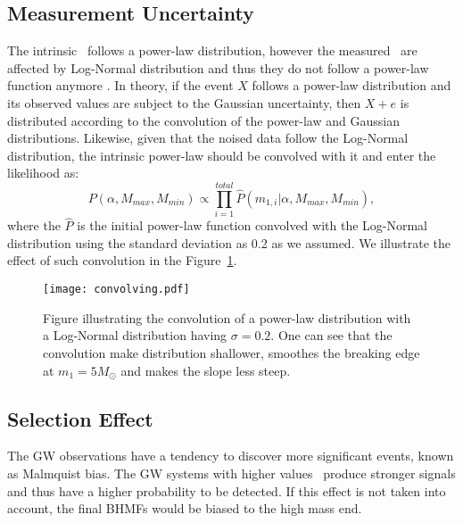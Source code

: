 \documentclass[twocolumn]{aastex62}
\begin{document}
\subsection{Measurement Uncertainty}\label{sec_likelihood_noise}
The intrinsic \mone\ follows a power-law distribution, however the measured  \mone\ are affected by Log-Normal distribution and thus they do not follow a power-law function anymore \citep{Koen2009}. In theory, if the event $X$ follows a power-law distribution and its observed values are subject to the Gaussian uncertainty, then $X + e$ is distributed according to the convolution of the power-law and Gaussian distributions. Likewise, given that the noised data follow the Log-Normal distribution, the intrinsic power-law should be convolved with it and enter the likelihood as:
 \begin{equation} \label{equ_lik_conv}
 P(\alpha, M_{max}, M_{min}) \propto  \prod_{i=1}^{total} \hat{P}(m_{1,i}|\alpha, M_{max}, M_{min}),
 \end{equation}
where the $\hat{P}$ is the initial power-law function convolved with the Log-Normal distribution using the standard deviation as 0.2 as we assumed. We illustrate the effect of such convolution in the Figure~\ref{fig:result_slope}.

\begin{figure}%
\texttt{[image: convolving.pdf]}
\caption{
Figure illustrating the convolution of a power-law distribution with a Log-Normal distribution having $\sigma = 0.2$. One can see that the convolution make distribution shallower, smoothes the breaking edge at $m_1 = 5 M_{\odot}$ and makes the slope less steep.
}
\label{fig:result_slope}
\end{figure}

\subsection{Selection Effect}\label{sec_likelihood_sf}
The GW observations have a tendency to discover more significant events, known as Malmquist bias. The GW systems with higher values \mone\ produce  stronger signals and thus have a higher probability to be detected. If this effect is not taken into account, the final BHMFs would be biased to the high mass end.
\end{document}
